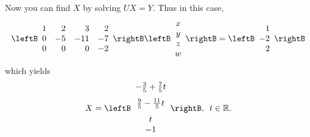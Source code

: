 \begin{solution}
Now you can find $X$ by solving $UX=Y$. Thus in this case, 
\begin{equation*}
\leftB 
\begin{array}{rrrr}
1 & 2 & 3 & 2 \\ 
0 & -5 & -11 & -7 \\ 
0 & 0 & 0 & -2
\end{array}
\rightB \leftB 
\begin{array}{c}
x \\ 
y \\ 
z \\ 
w
\end{array}
\rightB =\leftB 
\begin{array}{r}
1 \\ 
-2 \\ 
2
\end{array}
\rightB
\end{equation*}
which yields 
\begin{equation*}
X=\leftB 
\begin{array}{c}
-
\vspace{0.05in}\frac{3}{5}+\vspace{0.05in}\frac{7}{5}t \\ 
\vspace{0.05in}\frac{9}{5}-\vspace{0.05in}\frac{11}{5}t \\ 
t \\ 
-1
\end{array}
\rightB ,\enspace t\in \mathbb{R}\text{.}
\end{equation*}

\end{solution}